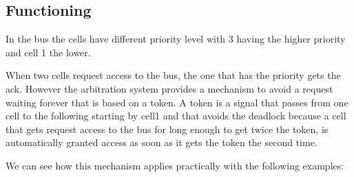 \documentclass{article}
\begin{document}
\subsection{Functioning}

In the bus the cells have different priority level with 3 having the higher 
priority and cell 1 the lower.

When two cells request access to the bus, the one that has the priority gets the
ack. However the arbitration system provides a mechanism to avoid a request waiting forever that 
is based on a token. A token is a signal that passes from one cell to the following
starting by cell1 and that avoids the deadlock because a cell that gets request
access to the bus for long enough to get twice the token, is automatically granted
access as soon as it gets the token the second time.

We can see how this mechanism applies practically with the following examples:
\end{document}
